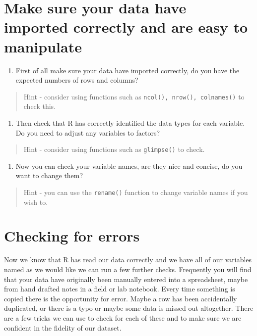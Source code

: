 \documentclass[
]{book}
\providecommand{\tightlist}{%
  \setlength{\itemsep}{0pt}\setlength{\parskip}{0pt}}
\begin{document}
\hypertarget{make-sure-your-data-have-imported-correctly-and-are-easy-to-manipulate}{%
\section{Make sure your data have imported correctly and are easy to manipulate}\label{make-sure-your-data-have-imported-correctly-and-are-easy-to-manipulate}}

\begin{enumerate}
\def\labelenumi{\arabic{enumi})}
\tightlist
\item
  First of all make sure your data have imported correctly, do you have the expected numbers of rows and columns?
\end{enumerate}

\begin{quote}
Hint - consider using functions such as \texttt{ncol(),\ nrow(),\ colnames()} to check this.
\end{quote}

\begin{enumerate}
\def\labelenumi{\arabic{enumi})}
\setcounter{enumi}{1}
\tightlist
\item
  Then check that R has correctly identified the data types for each variable. Do you need to adjust any variables to factors?
\end{enumerate}

\begin{quote}
Hint - consider using functions such as \texttt{glimpse()} to check.
\end{quote}

\begin{enumerate}
\def\labelenumi{\arabic{enumi})}
\setcounter{enumi}{2}
\tightlist
\item
  Now you can check your variable names, are they nice and concise, do you want to change them?
\end{enumerate}

\begin{quote}
Hint - you can use the \texttt{rename()} function to change variable names if you wish to.
\end{quote}

\hypertarget{checking-for-errors}{%
\section{Checking for errors}\label{checking-for-errors}}

Now we know that R has read our data correctly and we have all of our variables named as we would like we can run a few further checks. Frequently you will find that your data have originally been manually entered into a spreadsheet, maybe from hand drafted notes in a field or lab notebook. Every time something is copied there is the opportunity for error. Maybe a row has been accidentally duplicated, or there is a typo or maybe some data is missed out altogether. There are a few tricks we can use to check for each of these and to make sure we are confident in the fidelity of our dataset.
\end{document}
